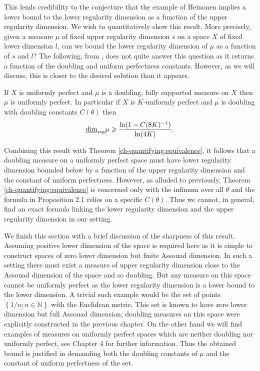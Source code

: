 This lends credibility to the conjecture that the example of Heinonen implies a lower bound to the lower regularity dimension as a function of the upper regularity dimension. We wish to quantitatively show this result. More precisely, given a measure $\mu$ of fixed upper regularity dimension $s$ on a space $X$ of fixed lower dimension $l$, can we bound the lower regularity dimension of $\mu$ as a function of $s$ and $l$? The following, from \cite{howroyd}, does not quite answer this question as it returns a function of the doubling and uniform perfectness constants. However, as we will discuss, this is closer to the desired solution than it appears.

\begin{proposition}\label{ch-quantifying:result-heinonen}
	If $X$ is uniformly perfect and $\mu$ is a doubling, fully supported measure on $X$ then $\mu$ is uniformly perfect. In particular if $X$ is $K$-uniformly perfect and $\mu$ is doubling with doubling constants $C(\theta)$ then  
	$$\underline{\dim}_{\textup{reg}} \mu \geqslant \frac{\ln(1-C(8K)^{-1})}{\ln(4K)} .$$  
\end{proposition}


Combining this result with Theorem \ref{ch-quantifying:equivalence}, it follows that a doubling measure on a uniformly perfect space must have lower regularity dimension bounded below by a function of the upper regularity dimension and the constant of uniform perfectness. However, as alluded to previously, Theorem \ref{ch-quantifying:equivalence} is concerned only with the infimum over all $\theta$ and the formula in Proposition 2.1 relies on a specific $C(\theta)$. Thus we cannot, in general, find an exact formula linking the lower regularity dimension and the upper regularity dimension in our setting.


We finish this section with a brief discussion of the sharpness of this result. Assuming positive lower dimension of the space is required here as it is simple to construct spaces of zero lower dimension but finite Assouad dimension. In such a setting there must exist a measure of upper regularity dimension close to the Assouad dimension of the space and so doubling. But any measure on this space cannot be uniformly perfect as the lower regularity dimension is a lower bound to the lower dimension. A trivial such example would be the set of points $\left\{ 1/n : n \in \mathbb{N} \right\}$ with the Euclidean metric. This set is known to have zero lower dimension but full Assouad dimension; doubling measures on this space were explicitly constructed in the previous chapter. On the other hand we will find examples of measures on uniformly perfect spaces which are neither doubling nor uniformly perfect, see Chapter 4 for further information. Thus the obtained bound is justified in demanding both the doubling constants of $\mu$ and the constant of uniform perfectness of the set.

